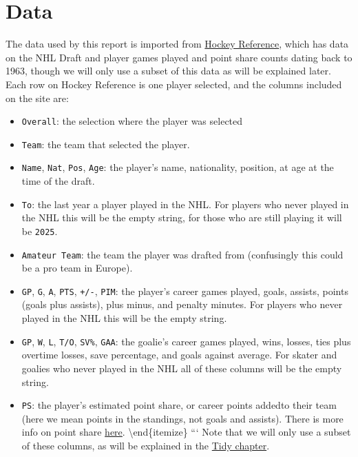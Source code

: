 \documentclass[
  letterpaper,
  DIV=11,
  numbers=noendperiod]{scrreprt}
\providecommand{\tightlist}{%
  \setlength{\itemsep}{0pt}\setlength{\parskip}{0pt}}\usepackage{longtable,booktabs,array}
\begin{document}
\section{Data}\label{data}

The data used by this report is imported from
\href{https://www.hockey-reference.com/draft/}{Hockey Reference}, which
has data on the NHL Draft and player games played and point share counts
dating back to 1963, though we will only use a subset of this data as
will be explained later. Each row on Hockey Reference is one player
selected, and the columns included on the site are:

\begin{itemize}
\tightlist
\item
  \texttt{Overall}: the selection where the player was selected
\item
  \texttt{Team}: the team that selected the player.
\item
  \texttt{Name}, \texttt{Nat}, \texttt{Pos}, \texttt{Age}: the player's
  name, nationality, position, at age at the time of the draft.
\item
  \texttt{To}: the last year a player played in the NHL. For players who
  never played in the NHL this will be the empty string, for those who
  are still playing it will be \texttt{2025}.
\item
  \texttt{Amateur\ Team}: the team the player was drafted from
  (confusingly this could be a pro team in Europe).
\item
  \texttt{GP}, \texttt{G}, \texttt{A}, \texttt{PTS}, \texttt{+/-},
  \texttt{PIM}: the player's career games played, goals, assists, points
  (goals plus assists), plus minus, and penalty minutes. For players who
  never played in the NHL this will be the empty string.
\item
  \texttt{GP}, \texttt{W}, \texttt{L}, \texttt{T/O}, \texttt{SV\%},
  \texttt{GAA}: the goalie's career games played, wins, losses, ties
  plus overtime losses, save percentage, and goals against average. For
  skater and goalies who never played in the NHL all of these columns
  will be the empty string.
\item
  \texttt{PS}: the player's estimated point share, or career points
  addedto their team (here we mean points in the standings, not goals
  and assists). There is more info on point share
  \href{https://www.hockey-reference.com/about/point_shares.html}{here}.
  \textbackslash end\{itemize\} ``` Note that we will only use a subset
  of these columns, as will be explained in the
  \href{https://trevsteu.github.io/Stat468_Final/tidy.html}{Tidy
  chapter}.
\end{itemize}
\end{document}
